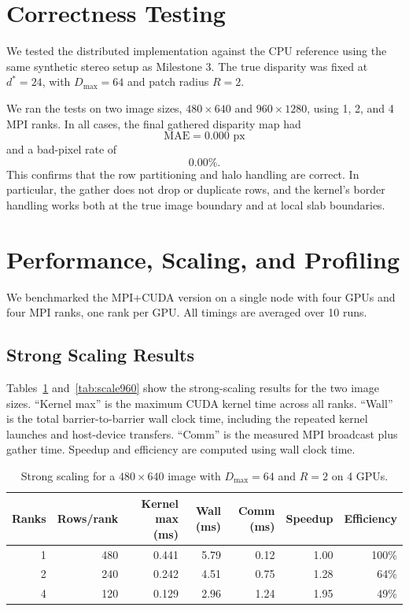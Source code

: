 \documentclass[11pt]{article}
\begin{document}
\section{Correctness Testing}

We tested the distributed implementation against the CPU reference using the same
synthetic stereo setup as Milestone 3. The true disparity was fixed at
$d^* = 24$, with $D_{\max}=64$ and patch radius $R=2$.

We ran the tests on two image sizes, $480 \times 640$ and $960 \times 1280$, using
1, 2, and 4 MPI ranks. In all cases, the final gathered disparity map had
\[
\text{MAE} = 0.000 \text{ px}
\]
and a bad-pixel rate of
\[
0.00\%.
\]
This confirms that the row partitioning and halo handling are correct. In particular,
the gather does not drop or duplicate rows, and the kernel's border handling works
both at the true image boundary and at local slab boundaries.

\section{Performance, Scaling, and Profiling}

We benchmarked the MPI+CUDA version on a single node with
four GPUs and four MPI ranks, one rank per GPU. All timings are
averaged over 10 runs.

\subsection{Strong Scaling Results}

Tables~\ref{tab:scale480} and~\ref{tab:scale960} show the strong-scaling results for
the two image sizes. ``Kernel max'' is the maximum CUDA kernel time across all ranks.
``Wall'' is the total barrier-to-barrier wall clock time, including the repeated kernel launches
and host-device transfers. ``Comm'' is the measured MPI broadcast plus gather time.
Speedup and efficiency are computed using wall clock time.

\begin{table}[H]
\centering
\caption{Strong scaling for a $480\times640$ image with $D_\text{max}=64$ and $R=2$ on 4 GPUs.}
\label{tab:scale480}
\begin{tabular}{rrrrrrr}
\toprule
Ranks & Rows/rank & Kernel max (ms) & Wall (ms) & Comm (ms) & Speedup & Efficiency \\
\midrule
1 & 480 & 0.441 & 5.79 & 0.12 & 1.00 & 100\% \\
2 & 240 & 0.242 & 4.51 & 0.75 & 1.28 & 64\% \\
4 & 120 & 0.129 & 2.96 & 1.24 & 1.95 & 49\% \\
\bottomrule
\end{tabular}
\end{table}
\end{document}
